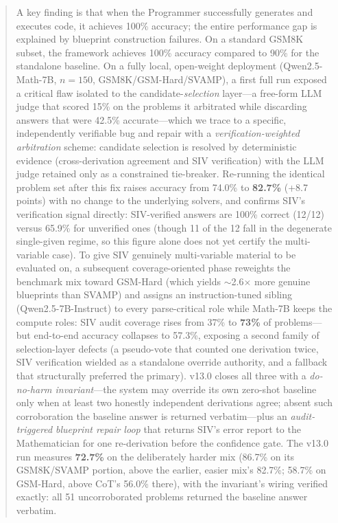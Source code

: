 \documentclass[11pt,a4paper]{article}
\begin{document}
\begin{abstract}
A key finding is that when the Programmer successfully generates and executes code, it achieves 100\% accuracy; the entire performance gap is explained by blueprint construction failures.
On a standard GSM8K subset, the framework achieves 100\% accuracy compared to 90\% for the standalone baseline.
On a fully local, open-weight deployment (Qwen2.5-Math-7B, $n{=}150$, GSM8K/GSM-Hard/SVAMP), a first full run exposed a critical flaw isolated to the candidate-\emph{selection} layer---a free-form LLM judge that scored 15\% on the problems it arbitrated while discarding answers that were 42.5\% accurate---which we trace to a specific, independently verifiable bug and repair with a \emph{verification-weighted arbitration} scheme: candidate selection is resolved by deterministic evidence (cross-derivation agreement and SIV verification) with the LLM judge retained only as a constrained tie-breaker. Re-running the identical problem set after this fix raises accuracy from 74.0\% to \textbf{82.7\%} (+8.7 points) with no change to the underlying solvers, and confirms SIV's verification signal directly: SIV-verified answers are 100\% correct (12/12) versus 65.9\% for unverified ones (though 11 of the 12 fall in the degenerate single-given regime, so this figure alone does not yet certify the multi-variable case).
To give SIV genuinely multi-variable material to be evaluated on, a subsequent coverage-oriented phase reweights the benchmark mix toward GSM-Hard (which yields $\sim$2.6$\times$ more genuine blueprints than SVAMP) and assigns an instruction-tuned sibling (Qwen2.5-7B-Instruct) to every parse-critical role while Math-7B keeps the compute roles: SIV audit coverage rises from 37\% to \textbf{73\%} of problems---but end-to-end accuracy collapses to 57.3\%, exposing a second family of selection-layer defects (a pseudo-vote that counted one derivation twice, SIV verification wielded as a standalone override authority, and a fallback that structurally preferred the primary).
v13.0 closes all three with a \emph{do-no-harm invariant}---the system may override its own zero-shot baseline only when at least two honestly independent derivations agree; absent such corroboration the baseline answer is returned verbatim---plus an \emph{audit-triggered blueprint repair loop} that returns SIV's error report to the Mathematician for one re-derivation before the confidence gate.
The v13.0 run measures \textbf{72.7\%} on the deliberately harder mix (86.7\% on its GSM8K/SVAMP portion, above the earlier, easier mix's 82.7\%; 58.7\% on GSM-Hard, above CoT's 56.0\% there), with the invariant's wiring verified exactly: all 51 uncorroborated problems returned the baseline answer verbatim.

\end{abstract}
\end{document}
